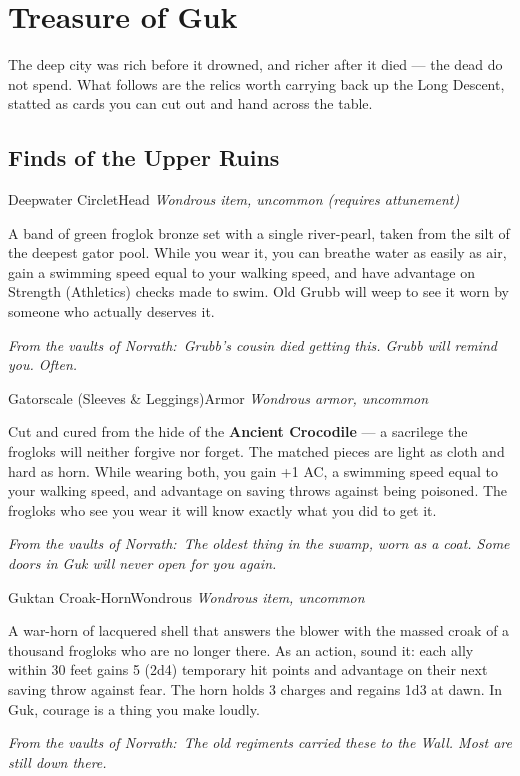 \documentclass[10pt,twoside]{report}
\newcommand{\itemtype}[1]{{\itshape #1}\par\vspace{2pt}{\color{gukgold!70!black}\rule{\linewidth}{0.6pt}}\par\vspace{2pt}}
\newcommand{\eqnote}[1]{\par\vspace{3pt}{\color{gukgold!70!black}\rule{\linewidth}{0.5pt}}\par
  {\footnotesize\itshape\color{gukstone}From the vaults of Norrath:~#1}\par}
\begin{document}
\clearpage
\chapter{Treasure of Guk}
\noindent The deep city was rich before it drowned, and richer after it died --- the dead do not spend. What follows are the relics worth carrying back up the Long Descent, statted as cards you can cut out and hand across the table.

\section{Finds of the Upper Ruins}

\begin{itemcard}{Deepwater Circlet}{Head}
\itemtype{Wondrous item, uncommon (requires attunement)}
A band of green froglok bronze set with a single river-pearl, taken from the silt of the deepest gator pool. While you wear it, you can breathe water as easily as air, gain a swimming speed equal to your walking speed, and have advantage on Strength (Athletics) checks made to swim. Old Grubb will weep to see it worn by someone who actually deserves it.
\eqnote{Grubb's cousin died getting this. Grubb will remind you. Often.}
\end{itemcard}

\begin{itemcard}{Gatorscale (Sleeves \& Leggings)}{Armor}
\itemtype{Wondrous armor, uncommon}
Cut and cured from the hide of the \textbf{Ancient Crocodile} --- a sacrilege the frogloks will neither forgive nor forget. The matched pieces are light as cloth and hard as horn. While wearing both, you gain +1 AC, a swimming speed equal to your walking speed, and advantage on saving throws against being poisoned. The frogloks who see you wear it will know exactly what you did to get it.
\eqnote{The oldest thing in the swamp, worn as a coat. Some doors in Guk will never open for you again.}
\end{itemcard}

\begin{itemcard}{Guktan Croak-Horn}{Wondrous}
\itemtype{Wondrous item, uncommon}
A war-horn of lacquered shell that answers the blower with the massed croak of a thousand frogloks who are no longer there. As an action, sound it: each ally within 30 feet gains 5 (2d4) temporary hit points and advantage on their next saving throw against fear. The horn holds 3 charges and regains 1d3 at dawn. In Guk, courage is a thing you make loudly.
\eqnote{The old regiments carried these to the Wall. Most are still down there.}
\end{itemcard}
\end{document}
